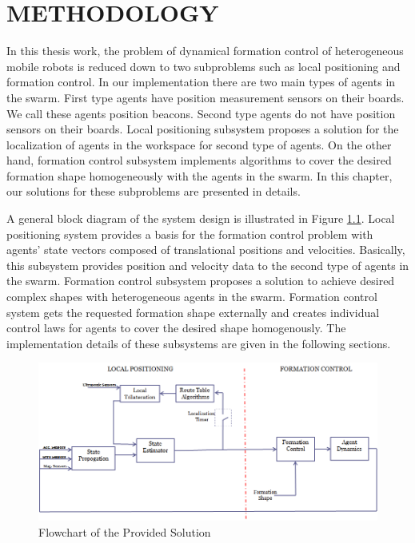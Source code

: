 

\chapter{METHODOLOGY}
\label{chp:Methodology}








In this thesis work, the problem of dynamical formation control of heterogeneous mobile robots is reduced down to two subproblems such as local positioning and formation control.  In our implementation there are two main types of agents in the swarm. First type agents have position measurement sensors on their boards. We call these agents position beacons. Second type agents do not have position sensors on their boards. Local positioning subsystem proposes a solution for the localization of agents in the workspace for second type of agents. On the other hand, formation control subsystem implements algorithms to cover the desired formation shape homogeneously with the agents in the swarm. In this chapter, our solutions for these subproblems are presented in details.

A general block diagram of the system design is illustrated in Figure \ref{general_system}. Local positioning system provides a basis for the formation control problem with agents' state vectors composed of translational positions and velocities. Basically, this subsystem provides position and velocity data to the second type of agents in the swarm. Formation control subsystem proposes a solution to achieve desired complex shapes with heterogeneous agents in the swarm. Formation control system gets the requested formation shape externally and creates individual control laws for agents to cover the desired shape homogenously. The implementation details of these subsystems are given in the following sections. 
\begin{figure}[H]
\caption{Flowchart of the Provided Solution} \label{general_system}
\centering
\includegraphics[scale = 0.58]{general_scheme}
\end{figure}

